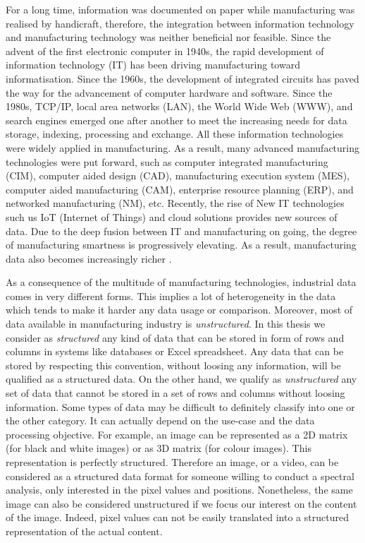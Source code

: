For a long time, information was documented on paper while manufacturing was realised by handicraft, therefore, the integration between information technology and manufacturing technology was neither beneficial nor feasible. Since the advent of the first electronic computer in 1940s, the rapid development of information technology (IT) has been driving manufacturing toward informatisation. Since the 1960s, the development of integrated circuits has paved the way for the advancement of computer hardware and software. Since the 1980s, TCP/IP, local area networks (LAN), the World Wide Web (WWW), and search engines emerged one after another to meet the increasing needs for data storage, indexing, processing and exchange. All these information technologies were widely applied in manufacturing. As a result, many advanced manufacturing technologies were put forward, such as computer integrated manufacturing (CIM), computer aided design (CAD), manufacturing execution system (MES), computer aided manufacturing (CAM), enterprise resource planning (ERP), and networked manufacturing (NM), etc. Recently, the rise of New IT technologies such us IoT (Internet of Things) and cloud solutions provides new sources of data. Due to the deep fusion between IT and manufacturing on going, the degree of manufacturing smartness is progressively elevating. As a result, manufacturing data also becomes increasingly richer \citep{tao2018data}.

As a consequence of the multitude of manufacturing technologies, industrial data comes in very different forms. This implies a lot of heterogeneity in the data which tends to make it harder any data usage or comparison. Moreover, most of data available in manufacturing industry is \textit{unstructured}. In this thesis we consider as \textit{structured} any kind of data that can be stored in form of rows and columns in systems like databases or Excel spreadsheet. Any data that can be stored by respecting this convention, without loosing any information, will be qualified as a structured data. On the other hand, we qualify as \textit{unstructured} any set of data that cannot be stored in a set of rows and columns without loosing information. Some types of data may be difficult to definitely classify into one or the other category. It can actually depend on the use-case and the data processing objective. For example, an image can be represented as a 2D matrix (for black and white images) or as 3D matrix (for colour images). This representation is perfectly structured. Therefore an image, or a video, can be considered as a structured data format for someone willing to conduct a spectral analysis, only interested in the pixel values and positions. Nonetheless, the same image can also be considered unstructured if we focus our interest on the content of the image. Indeed, pixel values can not be easily translated into a structured representation of the actual content.


